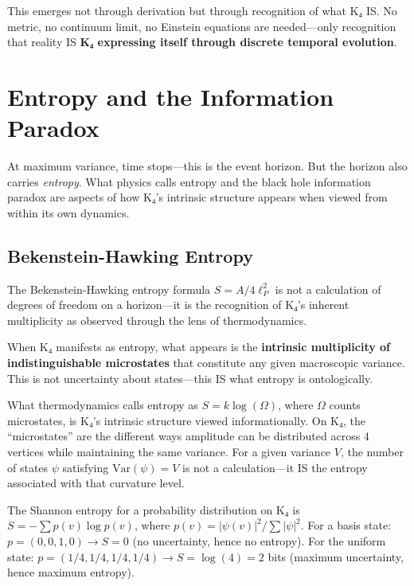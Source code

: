 \documentclass[11pt,a4paper]{book}
\begin{document}
This emerges not through derivation but through recognition of what K₄ IS. No metric, no continuum limit, no Einstein equations are needed—only recognition that reality IS \textbf{K₄ expressing itself through discrete temporal evolution}.


\chapter{Entropy and the Information Paradox}
\label{chap:entropy-information}

At maximum variance, time stops---this is the event horizon. But the horizon also carries \emph{entropy}. What physics calls entropy and the black hole information paradox are aspects of how K₄'s intrinsic structure appears when viewed from within its own dynamics.

\section{Bekenstein-Hawking Entropy}

The Bekenstein-Hawking entropy formula $S = A/4\ell_P^2$ is not a calculation of degrees of freedom on a horizon—it is the recognition of K₄'s inherent multiplicity as observed through the lens of thermodynamics.

When K₄ manifests as entropy, what appears is the \textbf{intrinsic multiplicity of indistinguishable microstates} that constitute any given macroscopic variance. This is not uncertainty about states—this IS what entropy is ontologically.

What thermodynamics calls entropy as $S = k \log(\Omega)$, where $\Omega$ counts microstates, is K₄'s intrinsic structure viewed informationally. On K₄, the ``microstates'' are the different ways amplitude can be distributed across 4 vertices while maintaining the same variance. For a given variance $V$, the number of states $\psi$ satisfying $\text{Var}(\psi) = V$ is not a calculation—it IS the entropy associated with that curvature level.

The Shannon entropy for a probability distribution on K₄ is $S = -\sum p(v) \log p(v)$, where $p(v) = |\psi(v)|^2 / \sum|\psi|^2$. For a basis state: $p = (0,0,1,0) \to S = 0$ (no uncertainty, hence no entropy). For the uniform state: $p = (1/4,1/4,1/4,1/4) \to S = \log(4) = 2$ bits (maximum uncertainty, hence maximum entropy).
\end{document}
